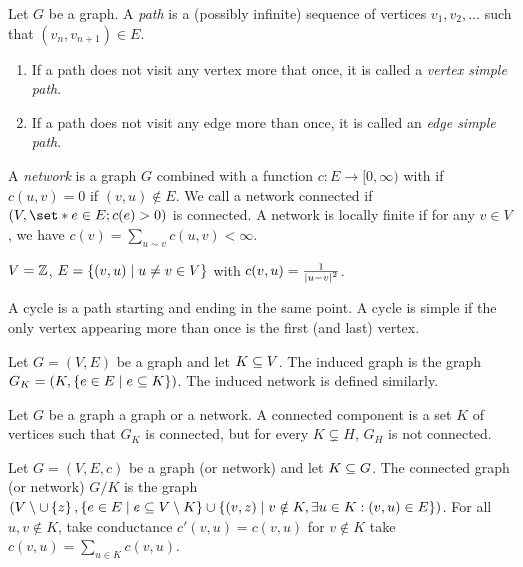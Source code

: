 \begin{defn}
  Let $G$ be a graph. A \emph{path} is a (possibly infinite) sequence of vertices $v_1,v_2,\dots$ such that $(v_n,v_{n+1})\in E$. 
  \begin{enumerate}[1)]
    \item If a path does not visit any vertex more that once, it is called a \emph{vertex simple path}.
    \item If a path does not visit any edge more than once, it is called an \emph{edge simple path}.
  \end{enumerate}
\end{defn}


\begin{defn}[Network]
  A \emph{network} is a graph $G$ combined with a function $c:E\to [0,\infty)$ with if $c(u,v)=0$ if $(v,u)\notin E$. We call a network connected if $(V, \set*{e\in E; c(e)>0})$ is connected. A network is locally finite if for any \(v\in V\), we have \(c(v) = \sum_{u\sim v}c(u,v)<\infty\).  
\end{defn}


\begin{lem}[Example]
  $V=\mathbb{Z}$, $E= \left\{ {(v,u) \; \vert \; u\neq v\in V} \right\}$ with $c(v,u)=\frac{1}{\abs{u-v}^2}$.
\end{lem}


\begin{defn}[Cycle]
  A cycle is a path starting and ending in the same point. A cycle is simple if the only vertex appearing more than once is the first (and last) vertex.
\end{defn}


\begin{defn}
  Let $G=(V,E)$ be a graph and let \(K\subseteq V\). The induced graph is the graph \(G_K=(K, \left\{ {e\in E \; \vert \; e \subseteq K} \right\})\). The induced network is defined similarly. 
\end{defn}

\begin{defn}
    Let $G$ be a graph a graph or a network. A connected component is a set $K$ of vertices such that $G_K$ is connected, but for every $K\subsetneq H $, $G_H$ is not connected.
\end{defn}

\begin{defn}
  Let $G=(V,E,c)$ be a graph (or network) and let $K\subseteq G$. The connected graph (or network) $G/K$ is the graph $(V\setminus \cup \left\{ {z} \right\}, \left\{ {e \in E \; \vert \; e \subseteq V\setminus K} \right\} \cup \left\{ {(v,z) \; \vert \; v \notin K, \exists u \in K: (v,u) \in E} \right\})$. For all $u,v \notin K$, take conductance \(c'(v,u) = c(v,u)\) for $v\notin K$ take $c(v,u)=\sum_{u\in K} c(v,u)$.
\end{defn}


